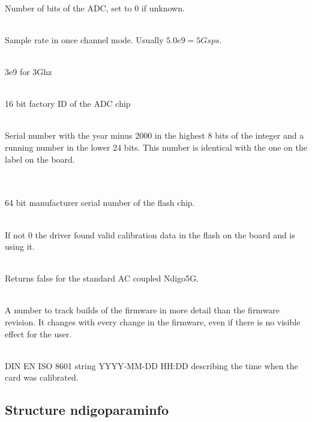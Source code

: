 			\\
			Number of bits of the ADC, set to 0 if unknown.\par

			\\
			Sample rate in once channel mode. Usually $5.0e9 = 5 Gsps$.\par

			\\
			3e9 for 3Ghz
			
			\\
			16 bit factory ID of the ADC chip\par
			
			\\
			Serial number with the year minus 2000 in the highest 8 bits of the integer and a running number in the lower 24 bits. This number is identical with the one on the label on the board.\par

			\\
			\\
			64 bit manufacturer serial number of the flash chip.\par

			\\
			If not 0 the driver found valid calibration data in the flash on the board and is using it.\par

			\\
			Returns false for the standard AC coupled Ndigo5G.\par

			\\
			A number to track builds of the firmware in more detail than the firmware revision. It changes with every change in the firmware, even if there is no visible effect for the user.\par
			
			\\
			DIN EN ISO 8601 string YYYY-MM-DD HH:DD describing the time when the card was calibrated.
		
		\subsection{Structure ndigo\tu param\tu info}
		

